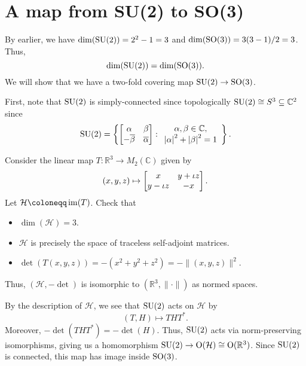 \documentclass[12pt]{article}
\begin{document}
\section{A map from SU(2) to SO(3)}

By earlier, we have $\dim(\operatorname{SU}(2)) = 2^{2} - 1 = 3$ and $\dim(\operatorname{SO}(3)) = 3(3 - 1)/2 = 3$. 
Thus,
\begin{equation*} 
	\dim(\operatorname{SU}(2)) = \dim(\operatorname{SO}(3)).
\end{equation*}
We will show that we have a two-fold covering map $\operatorname{SU}(2) \to \operatorname{SO}(3)$. 

First, note that $\operatorname{SU}(2)$ is simply-connected since topologically $\operatorname{SU}(2) \cong S^{3} \subseteq \mathbb{C}^{2}$ since
\begin{equation*} 
	\operatorname{SU}(2) = 
	\left\{\begin{bmatrix} \alpha & \beta \\ -\overline{\beta} & \overline{\alpha} \end{bmatrix} : 
	\begin{array}{c}
	\alpha, \beta \in \mathbb{C}, \\ 
	{\left\lvert \alpha \right\lvert}^{2} + {\left\lvert \beta \right\lvert}^{2} = 1
	\end{array}
	\right\}.
\end{equation*}

Consider the linear map $T \colon \mathbb{R}^{3} \to M_{2}(\mathbb{C})$ given by
\begin{equation*} 
	(x, y, z) \mapsto \begin{bmatrix} x & y + \iota z \\ y - \iota z & -x \end{bmatrix}.
\end{equation*}
Let $\mathcal{H} \coloneqq \im(T)$. Check that
\begin{itemize}
	\item $\dim(\mathcal{H}) = 3$.
	\item $\mathcal{H}$ is precisely the space of traceless self-adjoint matrices.
	\item $\det(T(x, y, z)) = -(x^{2} + y^{2} + z^{2}) = -\|(x, y, z)\|^{2}$.
\end{itemize}
Thus, $(\mathcal{H}, -\det)$ is isomorphic to $(\mathbb{R}^{3}, \|\cdot\|)$ as normed spaces.

By the description of $\mathcal{H}$, we see that $\operatorname{SU}(2)$ acts on $\mathcal{H}$ by
\begin{equation*} 
	(T, H) \mapsto THT^{\ast}.
\end{equation*}
Moreover, $-\det(THT^{\ast}) = -\det(H)$. 
Thus, $\operatorname{SU}(2)$ acts via norm-preserving isomorphisms, giving us a homomorphism $\operatorname{SU}(2) \to \operatorname{O}(\mathcal{H}) \cong \operatorname{O}(\mathbb{R}^{3})$. 
Since $\operatorname{SU}(2)$ is connected, this map has image inside $\operatorname{SO}(3)$.
\end{document}
